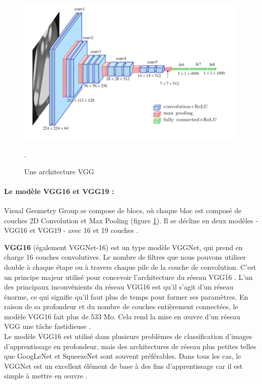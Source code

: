 	
	\begin{figure}[H]%
		\centering
		\includegraphics[width=\textwidth]{images/VGG-16-network-architecture.png}
		\caption{Une architecture VGG \cite{ml2008python}}.
		\label{fig:VGG_network}
	\end{figure}

	\paragraph{Le modèle VGG16 et VGG19 :}
	
	Visual Geometry Group se compose de blocs, où chaque bloc est composé de couches 2D Convolution et Max Pooling (figure \ref{fig:VGG_network}). Il se décline en deux modèles - VGG16 et VGG19 - avec 16 et 19 couches \cite{yu2016visualizing}.
	
	\textbf{VGG16} (également VGGNet-16) est un type modèle VGGNet, qui prend en charge 16 couches convolutives.
	Le nombre de filtres que nous pouvons utiliser double à chaque étape ou à travers chaque pile de la couche de convolution. C'est un principe majeur utilisé pour concevoir l'architecture du réseau VGG16 \cite{tammina2019transfer}. L'un des principaux inconvénients du réseau VGG16 est qu'il s'agit d'un réseau énorme, ce qui signifie qu'il faut plus de temps pour former ses paramètres.
	En raison de sa profondeur et du nombre de couches entièrement connectées, le modèle VGG16 fait plus de 533 Mo. Cela rend la mise en œuvre d'un réseau VGG une tâche fastidieuse \cite{yu2016visualizing}.\\
	Le modèle VGG16 est utilisé dans plusieurs problèmes de classification d'images d'apprentissage en profondeur, mais des architectures de réseau plus petites telles que GoogLeNet et SqueezeNet sont souvent préférables. Dans tous les cas, le VGGNet est un excellent élément de base à des fins d'apprentissage car il est simple à mettre en œuvre \cite{tammina2019transfer}.
	

